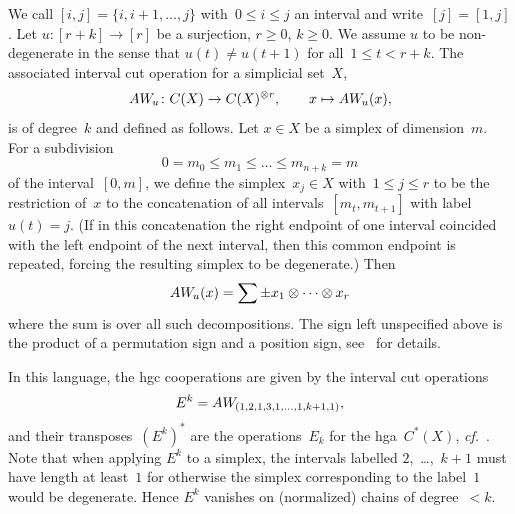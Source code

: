 \documentclass[letterpaper]{amsart}
\numberwithin{equation}{section}
\theoremstyle{plain}
\theoremstyle{definition}
\theoremstyle{remark}
\def\cf{\emph{cf.}}
\def\AW{AW}
\def\AWu#1{\AW_{\mkern -1mu #1}}
\begin{document}
We call $[i,j]=\{i,i+1,\dots,j\}$ with~$0\le i\le j$ an interval and write~$[j]=[1,j]$.
Let $u\colon[r+k]\to[r]$ be a surjection, $r\ge0$, $k\ge0$.
We assume $u$ to be non-degenerate in the sense that $u(t)\ne u(t+1)$ for all~$1\le t<r+k$.
The associated interval cut operation for a simplicial set~$X$,
\begin{equation}
  \AWu{u}\colon C(X) \to C(X)^{\otimes r},
  \qquad x \mapsto \AWu{u}(x),
\end{equation}
is of degree~$k$ and defined as follows. Let $x\in X$ be a simplex of dimension~$m$. For a subdivision
\begin{equation}
  0 = m_{0} \le m_{1} \le \dots \le m_{n+k} = m
\end{equation}
of the interval~$[0,m]$, we define the simplex~$x_{j}\in X$ with~$1\le j\le r$ to be the restriction of~$x$
to the concatenation of all intervals~$[m_{t},m_{t+1}]$ with label~$u(t)=j$. (If in this concatenation
the right endpoint of one interval coincided with the left endpoint of the next interval,
then this common endpoint is repeated, forcing the resulting simplex to be degenerate.) Then
\begin{equation}
  \AWu{u}(x) = \sum \pm x_{1}\otimes \dots \otimes x_{r}
\end{equation}
where the sum is over all such decompositions. The sign left unspecified above
is the product of a permutation sign and a position sign, see~\cite[\S 2.2.4]{BergerFresse:2004} for details.

In this language, the hgc cooperations are given by the interval cut operations
\begin{equation}
  \label{eq:def-hg-chains}
  E^{k} = \AWu{(1,2,1,3,1,\dots,1,k+1,1)},
\end{equation}
and their transposes~$(E^{k})^{*}$ are the operations~$E_{k}$ for the hga~$C^{*}(X)$, \cf~\cite[Sec.~8.2]{Franz:homog}.
Note that when applying $E^{k}$ to a simplex,
the intervals labelled $2$,~\dots,~$k+1$ must have length at least~$1$
for otherwise the simplex corresponding to the label~$1$ would be degenerate.
Hence $E^{k}$ vanishes on (normalized) chains of degree~$<k$.
\end{document}
